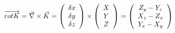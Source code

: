 \documentclass[a4paper]{article}
\begin{document}
		\begin{fdef}
			
			\begin{align*}
				\overrightarrow {rot K} = \vec \nabla \times \vec K = \left( \begin{array}{c} \delta x\\ \delta y \\ \delta z  \end{array} \right)\times \left( \begin{array}{c} X\\ Y \\ Z \end{array} \right) = \left( \begin{array}{c} Z_y - Y_z \\ X_z - Z_x \\ Y_x - X_y \end{array} \right) 
			\end{align*}
		\end{fdef}
		
\end{document}
